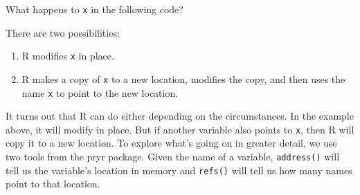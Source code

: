 
What happens to \texttt{x} in the following code?
 

\begin{Shaded}
\begin{Highlighting}[]
\StringTok{ }\NormalTok{:}
\NormalTok{x[}\NormalTok{] <-}\StringTok{ }
\end{Highlighting}
\end{Shaded}

There are two possibilities:

\begin{enumerate}
\def\labelenumi{\arabic{enumi}.}
\item
  R modifies \texttt{x} in place.
\item
  R makes a copy of \texttt{x} to a new location, modifies the copy, and
  then uses the name \texttt{x} to point to the new location.
\end{enumerate}

It turns out that R can do either depending on the circumstances. In the
example above, it will modify in place. But if another variable also
points to \texttt{x}, then R will copy it to a new location. To explore
what's going on in greater detail, we use two tools from the pryr
package. Given the name of a variable, \texttt{address()} will tell us
the variable's location in memory and \texttt{refs()} will tell us how
many names point to that location.  

\begin{Shaded}
\begin{Highlighting}[]
\StringTok{ }\NormalTok{:}
\NormalTok{(}

\StringTok{ }
\NormalTok{(}
\end{Highlighting}
\end{Shaded}

